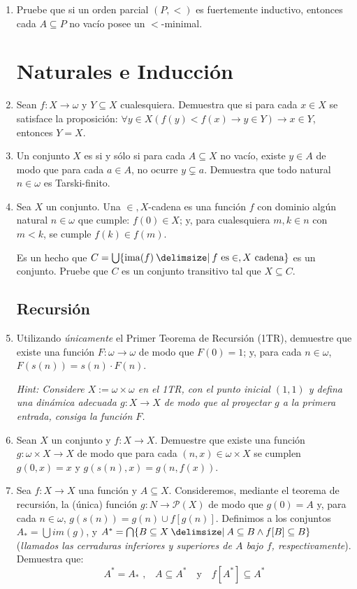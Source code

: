 \documentclass[11pt]{article}
\providecommand\st{\;|\;}
\newcommand\SetSymbol[1][]{%
    \nonscript\:#1\vert
    \allowbreak
    \nonscript\:
    \mathopen{}}
\renewcommand\st{\SetSymbol[\delimsize]}
\renewcommand\st{\SetSymbol[\delimsize]}
\newcommand{\set}[1]{\{#1\}}
\DeclareMathOperator{\ima}{ima}
\begin{document}
\begin{enumerate}[\bf\text{Ej.} 1.]
    \item Pruebe que si un orden parcial $(P,<)$ es fuertemente inductivo, entonces cada $A \subseteq P$ no vacío posee un $<$-minimal.
    
    \section*{Naturales e Inducción}
    \item Sean $f:X\to \omega$ y $Y\subseteq X$ cualesquiera. Demuestra que si para cada $x\in X$ se satisface la proposición: $\forall y\in X (f(y)<f(x) \to y\in Y) \to x\in Y$, entonces $Y=X$.
    
    \item Un conjunto $X$ es  si y sólo si para cada $A \subseteq X$ no vacío, existe $y \in A$ de modo que para cada $a \in A$, no ocurre $y \subsetneq a$. Demuestra que todo natural $n \in \omega$ es Tarski-finito.
   

    \item Sea $X$ un conjunto. Una $\in,X$-cadena es una función $f$ con dominio algún natural $n \in \omega$ que cumple: $f(0) \in X$; y, para cualesquiera $m,k \in n$ con $m<k$, se cumple $f(k) \in f(m)$. 
    
    Es un hecho que $C=\bigcup \{ \ima(f) \st f \text{ es} \in,X \text{ cadena}\}$ es un conjunto. Pruebe que $C$ es un conjunto transitivo tal que $X \subseteq C$.

    \subsection*{Recursión}
    \item Utilizando \textit{únicamente} el Primer Teorema de Recursión (1TR), demuestre que existe una función $F:\omega \to \omega$ de modo que $F(0)=1$; y, para cada $n \in \omega$, $F(s(n))=s(n) \cdot F(n)$.
    
    \hfill \textit{Hint: Considere $X:=\omega \times \omega$ en el 1TR, con el punto inicial $(1,1)$ y defina una dinámica adecuada $g:X \to X$ de modo que al proyectar $g$ a la primera entrada, consiga la función $F$.}
    
    \item Sean $X$ un conjunto y $f:X \to X$. Demuestre que existe una función $g:\omega \times X \to X$ de modo que para cada $(n,x) \in \omega \times X$ se cumplen $g(0,x)=x$ y $g(s(n),x)=g(n,f(x))$.

    \item Sea $f\colon X\to X$ una función y $A\subseteq X$. Consideremos, mediante el teorema de recursión, la  (única) función $g\colon N\to \mathscr{P}(X)$ de modo que $g(0) = A$ y, para cada $n \in \omega$, $g(s(n)) = g(n)\cup f[g(n)]$.
    Definimos a los conjuntos $A_*=\bigcup im(g)$, y $A^*= \bigcap\set{B\subseteq X \st A\subseteq B \wedge f[B]\subseteq B}$ (\textit{llamados las cerraduras inferiores y superiores de $A$ bajo $f$, respectivamente}). Demuestra que:
    $$ A^*=A_* \text{ ,} \quad A\subseteq A^* \quad \text{y} \quad f[A^*]\subseteq A^* $$



    \end{enumerate}
\end{document}
